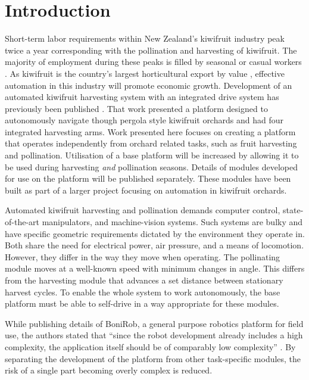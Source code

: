 \documentclass[preprint,authoryear,12pt]{elsarticle}
\begin{document}
\section{Introduction}
\label{sect:intro}
    Short-term labor requirements within New Zealand's kiwifruit industry peak twice a year corresponding with the pollination and harvesting of kiwifruit.
    The majority of employment during these peaks is filled by seasonal or casual workers \citep{Timmins2009}.
    As kiwifruit is the country's largest horticultural export by value \citep{StatisticsNewZealand2015}, effective automation in this industry will promote economic growth.
    Development of an automated kiwifruit harvesting system with an integrated drive system has previously been published \citep{Scarfe2012}.
    That work presented a platform designed to autonomously navigate though pergola style kiwifruit orchards and had four integrated harvesting arms.
    Work presented here focuses on creating a platform that operates independently from orchard related tasks, such as fruit harvesting and pollination.
    Utilisation of a base platform will be increased by allowing it to be used during harvesting \emph{and} pollination seasons.
    Details of modules developed for use on the platform will be published separately.
    These modules have been built as part of a larger project focusing on automation in kiwifruit orchards.

    Automated kiwifruit harvesting and pollination demands computer control, state-of-the-art manipulators, and machine-vision systems.
    Such systems are bulky and have specific geometric requirements dictated by the environment they operate in.
    Both share the need for electrical power, air pressure, and a means of locomotion.
    However, they differ in the way they move when operating.
    The pollinating module moves at a well-known speed with minimum changes in angle.
    This differs from the harvesting module that advances a set distance between stationary harvest cycles.
    To enable the whole system to work autonomously, the base platform must be able to self-drive in a way appropriate for these modules.

    While publishing details of BoniRob, a general purpose robotics platform for field use, the authors stated that ``since the robot development already includes a high complexity, the application itself should be of comparably low complexity'' \citep{Ruckelshausen2009}.
    By separating the development of the platform from other task-specific modules, the risk of a single part becoming overly complex is reduced.
\end{document}
